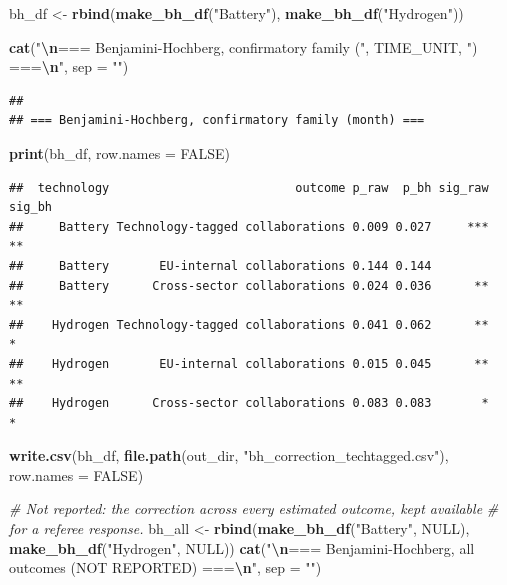 \documentclass[
]{article}
\newenvironment{Shaded}{\begin{snugshade}}{\end{snugshade}}
\newcommand{\AttributeTok}[1]{\textcolor[rgb]{0.13,0.29,0.53}{#1}}
\newcommand{\CommentTok}[1]{\textcolor[rgb]{0.56,0.35,0.01}{\textit{#1}}}
\newcommand{\ConstantTok}[1]{\textcolor[rgb]{0.56,0.35,0.01}{#1}}
\newcommand{\FunctionTok}[1]{\textcolor[rgb]{0.13,0.29,0.53}{\textbf{#1}}}
\newcommand{\NormalTok}[1]{#1}
\newcommand{\OtherTok}[1]{\textcolor[rgb]{0.56,0.35,0.01}{#1}}
\newcommand{\SpecialCharTok}[1]{\textcolor[rgb]{0.81,0.36,0.00}{\textbf{#1}}}
\newcommand{\StringTok}[1]{\textcolor[rgb]{0.31,0.60,0.02}{#1}}
\begin{document}
\begin{Shaded}
\begin{Highlighting}[]
\NormalTok{bh\_df }\OtherTok{\textless{}{-}} \FunctionTok{rbind}\NormalTok{(}\FunctionTok{make\_bh\_df}\NormalTok{(}\StringTok{"Battery"}\NormalTok{), }\FunctionTok{make\_bh\_df}\NormalTok{(}\StringTok{"Hydrogen"}\NormalTok{))}

\FunctionTok{cat}\NormalTok{(}\StringTok{"}\SpecialCharTok{\textbackslash{}n}\StringTok{=== Benjamini{-}Hochberg, confirmatory family ("}\NormalTok{, TIME\_UNIT, }\StringTok{") ===}\SpecialCharTok{\textbackslash{}n}\StringTok{"}\NormalTok{, }\AttributeTok{sep =} \StringTok{""}\NormalTok{)}
\end{Highlighting}
\end{Shaded}

\begin{verbatim}
## 
## === Benjamini-Hochberg, confirmatory family (month) ===
\end{verbatim}

\begin{Shaded}
\begin{Highlighting}[]
\FunctionTok{print}\NormalTok{(bh\_df, }\AttributeTok{row.names =} \ConstantTok{FALSE}\NormalTok{)}
\end{Highlighting}
\end{Shaded}

\begin{verbatim}
##  technology                          outcome p_raw  p_bh sig_raw sig_bh
##     Battery Technology-tagged collaborations 0.009 0.027     ***     **
##     Battery       EU-internal collaborations 0.144 0.144               
##     Battery      Cross-sector collaborations 0.024 0.036      **     **
##    Hydrogen Technology-tagged collaborations 0.041 0.062      **      *
##    Hydrogen       EU-internal collaborations 0.015 0.045      **     **
##    Hydrogen      Cross-sector collaborations 0.083 0.083       *      *
\end{verbatim}

\begin{Shaded}
\begin{Highlighting}[]
\FunctionTok{write.csv}\NormalTok{(bh\_df,}
          \FunctionTok{file.path}\NormalTok{(out\_dir, }\StringTok{"bh\_correction\_techtagged.csv"}\NormalTok{), }\AttributeTok{row.names =} \ConstantTok{FALSE}\NormalTok{)}

\CommentTok{\# Not reported: the correction across every estimated outcome, kept available}
\CommentTok{\# for a referee response.}
\NormalTok{bh\_all }\OtherTok{\textless{}{-}} \FunctionTok{rbind}\NormalTok{(}\FunctionTok{make\_bh\_df}\NormalTok{(}\StringTok{"Battery"}\NormalTok{, }\ConstantTok{NULL}\NormalTok{), }\FunctionTok{make\_bh\_df}\NormalTok{(}\StringTok{"Hydrogen"}\NormalTok{, }\ConstantTok{NULL}\NormalTok{))}
\FunctionTok{cat}\NormalTok{(}\StringTok{"}\SpecialCharTok{\textbackslash{}n}\StringTok{=== Benjamini{-}Hochberg, all outcomes (NOT REPORTED) ===}\SpecialCharTok{\textbackslash{}n}\StringTok{"}\NormalTok{, }\AttributeTok{sep =} \StringTok{""}\NormalTok{)}
\end{Highlighting}
\end{Shaded}
\end{document}

